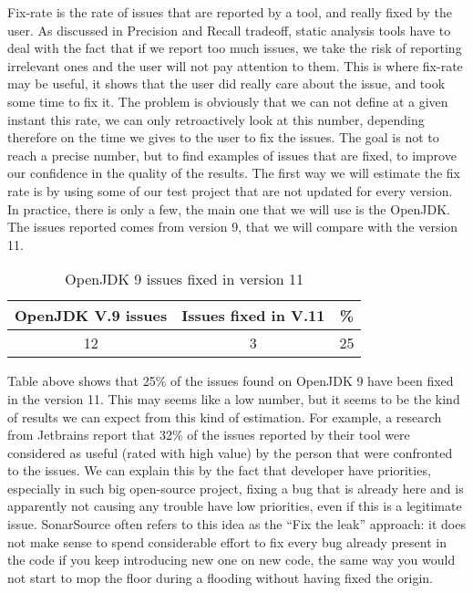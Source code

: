 Fix-rate is the rate of issues that are reported by a tool, and really fixed by the user. 
As discussed in Precision and Recall tradeoff, static analysis tools have to deal with the fact that if we report too much issues, we take the risk of reporting irrelevant ones and the user will not pay attention to them. 
This is where fix-rate may be useful, it shows that the user did really care about the issue, and took some time to fix it. \newline
The problem is obviously that we can not define at a given instant this rate, we can only retroactively look at this number, depending therefore on the time we gives to the user to fix the issues.
The goal is not to reach a precise number, but to find examples of issues that are fixed, to improve our confidence in the quality of the results.\newline
The first way we will estimate the fix rate is by using some of our test project that are not updated for every version. 
In practice, there is only a few, the main one that we will use is the OpenJDK. 
The issues reported comes from version 9, that we will compare with the version 11.

\begin{table}[h]
	\centering
	\caption{OpenJDK 9 issues fixed in version 11}
	\label{table:openJDK_issues}
	\begin{tabular}{|c|c|c|}
		\hline
		\bf OpenJDK V.9  issues & \bf Issues fixed in V.11 & \bf \% \\ \hline
		12 &  3 &  25 \\ \hline
	\end{tabular}
\end{table}

Table above shows that 25\% of the issues found on OpenJDK 9 have been fixed in the version 11. This may seems like a low number, but it seems to be the kind of results we can expect from this kind of estimation. For example, a research from Jetbrains \cite{Bryksin:2018:DAK:3236454.3236457} report that 32\% of the issues reported by their tool were considered as useful (rated with high value) by the person that were confronted to the issues. 
We can explain this by the fact that developer have priorities, especially in such big open-source project, fixing a bug that is already here and is apparently not causing any trouble have low priorities, even if this is a legitimate issue. 
SonarSource often refers to this idea as the “Fix the leak” approach: it does not make sense to spend considerable effort to fix every bug already present in the code if you keep introducing new one on new code, the same way you would not start to mop the floor during a flooding without having fixed the origin.

